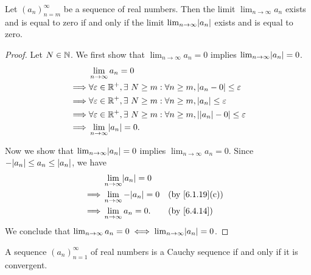 \begin{cor}\label{6.4.17}
  Let \((a_n)_{n = m}^\infty\) be a sequence of real numbers.
  Then the limit \(\lim_{n \to \infty} a_n\) exists and is equal to zero if and only if the limit \(\lim_{n \to \infty} \abs{a_n}\) exists and is equal to zero.
\end{cor}

\begin{proof}
  Let \(N \in \mathbb{N}\).
  We first show that \(\lim_{n \to \infty} a_n = 0\) implies \(\lim_{n \to \infty} \abs{a_n} = 0\).
  \begin{align*}
             & \lim_{n \to \infty} a_n = 0                                                                              \\
    \implies & \forall \varepsilon \in \R^+, \exists\ N \geq m : \forall n \geq m, \abs{a_n - 0} \leq \varepsilon       \\
    \implies & \forall \varepsilon \in \R^+, \exists\ N \geq m : \forall n \geq m, \abs{a_n} \leq \varepsilon           \\
    \implies & \forall \varepsilon \in \R^+, \exists\ N \geq m : \forall n \geq m, \abs{\abs{a_n} - 0} \leq \varepsilon \\
    \implies & \lim_{n \to \infty} \abs{a_n} = 0.
  \end{align*}

  Now we show that \(\lim_{n \to \infty} \abs{a_n} = 0\) implies \(\lim_{n \to \infty} a_n = 0\).
  Since \(-\abs{a_n} \leq a_n \leq \abs{a_n}\), we have
  \begin{align*}
             & \lim_{n \to \infty} \abs{a_n} = 0                                    \\
    \implies & \lim_{n \to \infty} -\abs{a_n} = 0 &  & \text{(by \cref{6.1.19}(c))} \\
    \implies & \lim_{n \to \infty} a_n = 0.       &  & \text{(by \cref{6.4.14})}
  \end{align*}
  We conclude that \(\lim_{n \to \infty} a_n = 0 \iff \lim_{n \to \infty} \abs{a_n} = 0\).
\end{proof}

\begin{thm}\label{6.4.18}
  A sequence \((a_n)_{n = 1}^\infty\) of real numbers is a Cauchy sequence if and only if it is convergent.
\end{thm}

